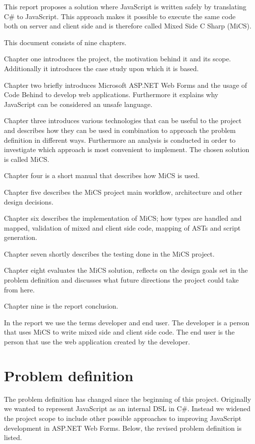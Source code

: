 	This report proposes a solution where JavaScript is written safely by translating C\# to JavaScript. This approach makes it possible to execute the same code both on server and client side and is therefore called Mixed Side C Sharp (MiCS).

	This document consists of nine chapters.

	Chapter one introduces the project, the motivation behind it and its scope. Additionally it introduces the case study upon which it is based.

	Chapter two briefly introduces Microsoft ASP.NET Web Forms and the usage of Code Behind to develop web applications. Furthermore it explains why JavaScript can be considered an unsafe language.

	Chapter three introduces various technologies that can be useful to the project and describes how they can be used in combination to approach the problem definition in different ways. Furthermore an analysis is conducted in order to investigate which approach is most convenient to implement. The chosen solution is called MiCS.

	Chapter four is a short manual that describes how MiCS is used.

	Chapter five describes the MiCS project main workflow, architecture and other design decisions.

	Chapter six describes the implementation of MiCS; how types are handled and mapped, validation of mixed and client side code, mapping of ASTs and script generation.

	Chapter seven shortly describes the testing done in the MiCS project.
	
	Chapter eight evaluates the MiCS solution, reflects on the design goals set in the problem definition and discusses what future directions the project could take from here.

	Chapter nine is the report conclusion.

	In the report we use the terms developer and end user. The developer is a person that uses MiCS to write mixed side and client side code. The end user is the person that use the web application created by the developer.


\section{Problem definition}
	The problem definition has changed since the beginning of this project. Originally we wanted to represent JavaScript as an internal DSL in C\#. Instead we widened the project scope to include other possible approaches to improving JavaScript development in ASP.NET Web Forms. Below, the revised problem definition is listed.

